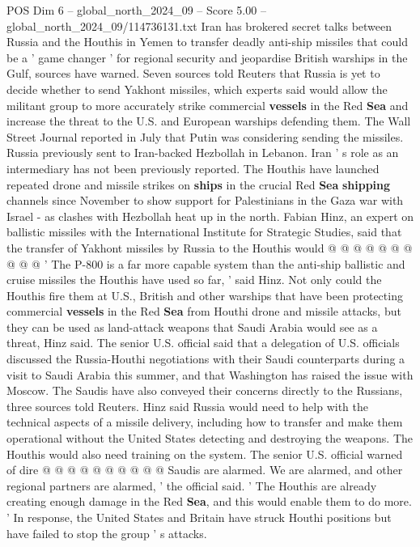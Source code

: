 \begin{textsample}{POS Dim 6 – global\_north\_2024\_09 – Score 5.00 – global\_north\_2024\_09/114736131.txt}  \label{ex:f6_pos_426}
Iran has brokered secret talks between Russia and the Houthis in Yemen to transfer deadly anti-ship missiles that could be a ' game changer ' for regional security and jeopardise British warships in the Gulf, sources have warned.
Seven sources told Reuters that Russia is yet to decide whether to send Yakhont missiles, which experts said would allow the militant group to more accurately strike commercial \textbf{vessels} in the Red \textbf{Sea} and increase the threat to the U.S. and European warships defending them.
The Wall Street Journal reported in July that Putin was considering sending the missiles.
Russia previously sent to Iran-backed Hezbollah in Lebanon.
Iran ' s role as an intermediary has not been previously reported.
The Houthis have launched repeated drone and missile strikes on \textbf{ships} in the crucial Red \textbf{Sea} \textbf{shipping} channels since November to show support for Palestinians in the Gaza war with Israel - as clashes with Hezbollah heat up in the north.
Fabian Hinz, an expert on ballistic missiles with the International Institute for Strategic Studies, said that the transfer of Yakhont missiles by Russia to the Houthis would @ @ @ @ @ @ @ @ @ @ ' The P-800 is a far more capable system than the anti-ship ballistic and cruise missiles the Houthis have used so far, ' said Hinz.
Not only could the Houthis fire them at U.S., British and other warships that have been protecting commercial \textbf{vessels} in the Red \textbf{Sea} from Houthi drone and missile attacks, but they can be used as land-attack weapons that Saudi Arabia would see as a threat, Hinz said.
The senior U.S. official said that a delegation of U.S. officials discussed the Russia-Houthi negotiations with their Saudi counterparts during a visit to Saudi Arabia this summer, and that Washington has raised the issue with Moscow.
The Saudis have also conveyed their concerns directly to the Russians, three sources told Reuters.
Hinz said Russia would need to help with the technical aspects of a missile delivery, including how to transfer and make them operational without the United States detecting and destroying the weapons.
The Houthis would also need training on the system.
The senior U.S. official warned of dire @ @ @ @ @ @ @ @ @ @ Saudis are alarmed.
We are alarmed, and other regional partners are alarmed, ' the official said. ' The Houthis are already creating enough damage in the Red \textbf{Sea}, and this would enable them to do more. ' In response, the United States and Britain have struck Houthi positions but have failed to stop the group ' s attacks.

\end{textsample}
